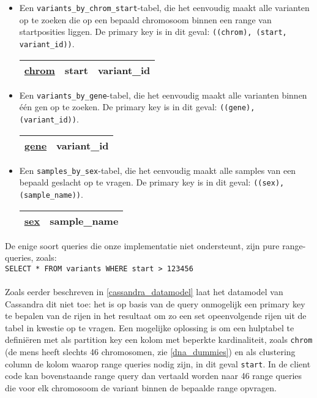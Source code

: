 \begin{itemize}
\item Een \texttt{variants\_by\_chrom\_start}-tabel, die het eenvoudig maakt alle varianten op te zoeken die op een bepaald chromosoom binnen een range van startposities liggen. De primary key is in dit geval: \texttt{((chrom), (start, variant\_id))}. 

\begin{table}[!htbp]
\begin{tabular}{@{}|l|l|l|@{}}
\toprule
\color{ForestGreen} \underline{chrom} & \color{red} start & \color{red} variant\_id \\ \bottomrule
\end{tabular}
\end{table}

\item Een \texttt{variants\_by\_gene}-tabel, die het eenvoudig maakt alle varianten binnen \'e\'en gen op te zoeken. De primary key is in dit geval: \texttt{((gene), (variant\_id))}.

\begin{table}[!htbp]
\begin{tabular}{@{}|l|l|@{}}
\toprule
\color{ForestGreen} \underline{gene} & \color{red} variant\_id \\ \bottomrule
\end{tabular}
\end{table}

\item Een \texttt{samples\_by\_sex}-tabel, die het eenvoudig maakt alle samples van een bepaald geslacht op te vragen. De primary key is in dit geval: \texttt{((sex), (sample\_name))}.

\begin{table}[!htbp]
\begin{tabular}{@{}|l|l|@{}}
\toprule
\color{ForestGreen} \underline{sex} & \color{red} sample\_name \\ \bottomrule
\end{tabular}
\end{table}
\end{itemize}

De enige soort queries die onze implementatie niet ondersteunt, zijn pure range-queries, zoals:\\

\texttt{SELECT * FROM variants WHERE start > 123456}\\\\
Zoals eerder beschreven in \ref{cassandra_datamodel} laat het datamodel van Cassandra dit niet toe: het is op basis van de query onmogelijk een primary key te bepalen van de rijen in het resultaat om zo een set opeenvolgende rijen uit de tabel in kwestie op te vragen. Een mogelijke oplossing is om een hulptabel te defini\"eren met als partition key een kolom met beperkte kardinaliteit, zoals \texttt{chrom} (de mens heeft slechts 46 chromosomen, zie \ref{dna_dummies}) en als clustering column de kolom waarop range queries nodig zijn, in dit geval \texttt{start}. In de client code kan bovenstaande range query dan vertaald worden naar 46 range queries die voor elk chromosoom de variant binnen de bepaalde range opvragen.   

